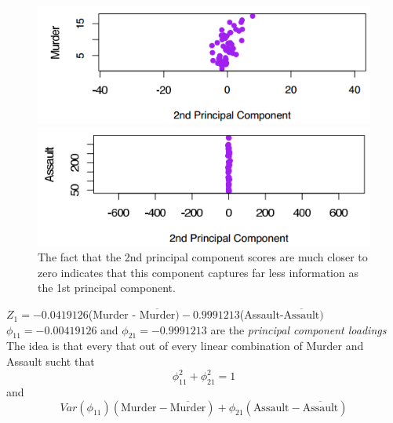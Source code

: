 {\begin{figure}[H]\centering
	\begin{minipage}[c]{0.5\textwidth}
		\includegraphics[width=1\linewidth]{images/USArrests_PCA5.png}
	\end{minipage}\hfill
	\begin{minipage}[c]{0.5\textwidth}
		\includegraphics[width=1\linewidth]{images/USArrests_PCA6.png}
	\end{minipage}\hfill
	\begin{minipage}[t]{.5\textwidth}
	\end{minipage}\hfill
	\begin{minipage}[t]{.5\textwidth}
	\end{minipage}
\caption{The fact that the 2nd principal component scores are much closer to zero indicates that this component captures far less information as the 1st principal component.}
\end{figure}
\RTheory
{	$Z_1=-0.0419126$(Murder - $\overline{\mbox{Murder}})-0.9991213$(Assault-$\overline{\mbox{Assault}})$
	\newline
	\newline
$\phi_{11} = - 0.00419126$ and $\phi_{21} = -0.9991213$ are the \textit{principal component loadings}
\newline
\newline
The idea is that every that out of every linear combination of Murder and Assault sucht that%
$$\phi_{11}^2+\phi_{21}^2 = 1$$
and \vfill
$$Var(\phi_{11})(\mbox{Murder}-\overline{\mbox{Murder}})+\phi_{21}(\mbox{Assault}-\overline{\mbox{Assault}})$$
}}
